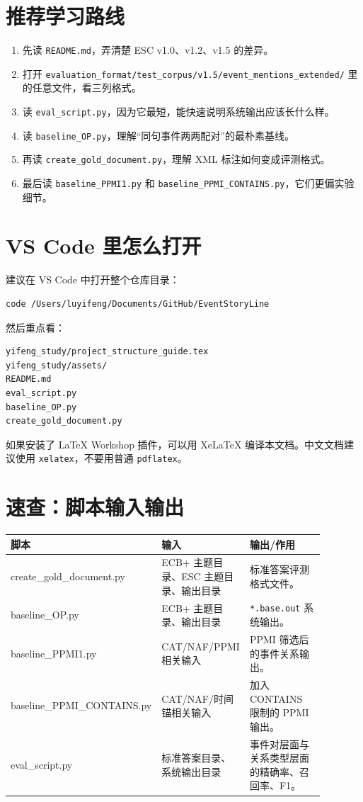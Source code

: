 \documentclass[11pt,a4paper,fontset=fandol]{ctexart}
\newcommand{\code}[1]{\texttt{#1}}
\begin{document}
\section{推荐学习路线}

\begin{enumerate}[leftmargin=2em]
  \item 先读 \code{README.md}，弄清楚 ESC v1.0、v1.2、v1.5 的差异。
  \item 打开 \code{evaluation\_format/test\_corpus/v1.5/event\_mentions\_extended/} 里的任意文件，看三列格式。
  \item 读 \code{eval\_script.py}，因为它最短，能快速说明系统输出应该长什么样。
  \item 读 \code{baseline\_OP.py}，理解“同句事件两两配对”的最朴素基线。
  \item 再读 \code{create\_gold\_document.py}，理解 XML 标注如何变成评测格式。
  \item 最后读 \code{baseline\_PPMI1.py} 和 \code{baseline\_PPMI\_CONTAINS.py}，它们更偏实验细节。
\end{enumerate}

\section{VS Code 里怎么打开}

建议在 VS Code 中打开整个仓库目录：

\begin{lstlisting}[language=bash]
code /Users/luyifeng/Documents/GitHub/EventStoryLine
\end{lstlisting}

然后重点看：

\begin{lstlisting}
yifeng_study/project_structure_guide.tex
yifeng_study/assets/
README.md
eval_script.py
baseline_OP.py
create_gold_document.py
\end{lstlisting}

如果安装了 LaTeX Workshop 插件，可以用 XeLaTeX 编译本文档。中文文档建议使用 \code{xelatex}，不要用普通 \code{pdflatex}。

\section{速查：脚本输入输出}

\begin{longtable}{>{\ttfamily}p{0.24\linewidth}p{0.29\linewidth}p{0.35\linewidth}}
\toprule
\normalfont 脚本 & 输入 & 输出/作用 \\
\midrule
create\_gold\_document.py & ECB+ 主题目录、ESC 主题目录、输出目录 & 标准答案评测格式文件。 \\
baseline\_OP.py & ECB+ 主题目录、输出目录 & \code{*.base.out} 系统输出。 \\
baseline\_PPMI1.py & CAT/NAF/PPMI 相关输入 & PPMI 筛选后的事件关系输出。 \\
baseline\_PPMI\_CONTAINS.py & CAT/NAF/时间锚相关输入 & 加入 CONTAINS 限制的 PPMI 输出。 \\
eval\_script.py & 标准答案目录、系统输出目录 & 事件对层面与关系类型层面的精确率、召回率、F1。 \\
\bottomrule
\end{longtable}
\end{document}
